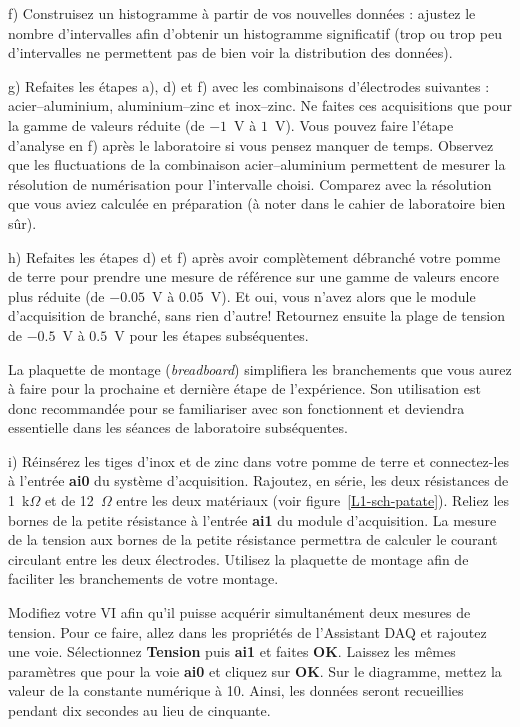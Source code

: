 \documentclass[canadien,12pt,oneside,letterpaper]{article}
\begin{document}
f) Construisez un histogramme à partir de vos nouvelles données : ajustez le nombre d'intervalles afin d'obtenir un histogramme significatif (trop ou trop peu d'intervalles ne permettent pas de bien voir la distribution des données).

g) Refaites les étapes a), d) et f) avec les combinaisons d'électrodes suivantes : acier--aluminium, aluminium--zinc et inox--zinc. Ne faites ces acquisitions que pour la gamme de valeurs réduite (de $-1$~V à $1$~V). Vous pouvez faire l'étape d'analyse en f) après le laboratoire si vous pensez manquer de temps. Observez que les fluctuations de la combinaison acier--aluminium permettent de mesurer la résolution de numérisation pour l'intervalle choisi. Comparez avec la résolution que vous aviez calculée en préparation (à noter dans le cahier de laboratoire bien sûr).

h) Refaites les étapes d) et f) après avoir complètement débranché votre pomme de terre pour prendre une mesure de référence sur une gamme de valeurs encore plus réduite (de $-0.05$~V à $0.05$~V). Et oui, vous n’avez alors que le module d’acquisition de branché, sans rien d’autre! Retournez ensuite la plage de tension de $-0.5$~V à $0.5$~V pour les étapes subséquentes.

La plaquette de montage (\textit{breadboard}) simplifiera les branchements que vous aurez à faire pour la prochaine et dernière étape de l'expérience. Son utilisation est donc recommandée pour se familiariser avec son fonctionnent et deviendra essentielle dans les séances de laboratoire subséquentes.

i) Réinsérez les tiges d'inox et de zinc dans votre pomme de terre et connectez-les à l'entrée \textbf{ai0} du système d'acquisition. Rajoutez, en série, les deux résistances de 1~k$\Omega$ et de 12~$\Omega$ entre les deux matériaux (voir figure~\ref{L1-sch-patate}). Reliez les bornes de la petite résistance à l'entrée \textbf{ai1} du module d'acquisition. La mesure de la tension aux bornes de la petite résistance permettra de calculer le courant circulant entre les deux électrodes. Utilisez la plaquette de montage afin de faciliter les branchements de votre montage.

Modifiez votre VI afin qu'il puisse acquérir simultanément deux mesures de tension. Pour ce faire, allez dans les propriétés de l'Assistant DAQ et rajoutez une voie. Sélectionnez \textbf{Tension} puis \textbf{ai1} et faites \textbf{OK}. Laissez les mêmes paramètres que pour la voie \textbf{ai0} et cliquez sur \textbf{OK}. Sur le diagramme, mettez la valeur de la constante numérique à 10. Ainsi, les données seront recueillies pendant dix secondes au lieu de cinquante.
\end{document}
